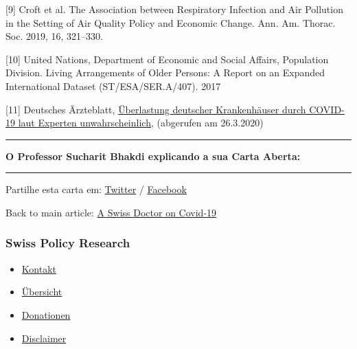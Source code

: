 {[}9{]} Croft et al. The Association between Respiratory Infection and
Air Pollution in the Setting of Air Quality Policy and Economic Change.
Ann. Am. Thorac. Soc. 2019, 16, 321--330.

{[}10{]} United Nations, Department of Economic and Social Affairs,
Population Division. Living Arrange­ments of Older Persons: A Report on
an Expanded International Dataset (ST/ESA/SER.A/407). 2017

{[}11{]} Deutsches Ärzteblatt,
\href{https://www.aerzteblatt.de/nachrichten/111029/Ueberlastung-deutscher-Krankenhaeuser-durch-COVID-19-laut-Experten-unwahrscheinlich}{Überlastung
deutscher Krankenhäuser durch COVID-19 laut Experten unwahrscheinlich},
(abgerufen am 26.3.2020)

\begin{center}\rule{0.5\linewidth}{\linethickness}\end{center}

\textbf{O Professor Sucharit Bhakdi explicando a sua Carta Aberta:}

\begin{center}\rule{0.5\linewidth}{\linethickness}\end{center}

Partilhe esta carta em:
\href{https://twitter.com/intent/tweet?url=https://swprs.org/carta-aberta-do-professor-sucharit-bhakdi-a-chanceler-alema-dra-angela-merkel/}{Twitter}
/
\href{https://www.facebook.com/share.php?u=https://swprs.org/carta-aberta-do-professor-sucharit-bhakdi-a-chanceler-alema-dra-angela-merkel/}{Facebook}

Back to main article:
\href{https://swprs.org/a-swiss-doctor-on-covid-19/}{A Swiss Doctor on
Covid-19}

\hypertarget{swiss-policy-research}{%
\subsubsection{Swiss Policy Research}\label{swiss-policy-research}}

\begin{itemize}
\tightlist
\item
  \href{https://swprs.org/kontakt/}{Kontakt}
\item
  \href{https://swprs.org/uebersicht/}{Übersicht}
\item
  \href{https://swprs.org/donationen/}{Donationen}
\item
  \href{https://swprs.org/disclaimer/}{Disclaimer}
\end{itemize}

